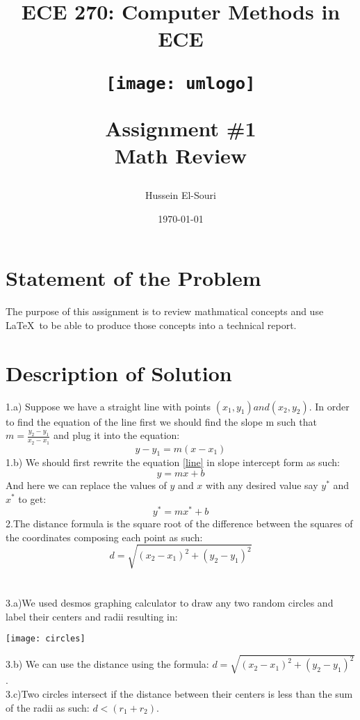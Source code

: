 \documentclass[letterpaper, 24pt, final, onecolumn, titlepage] {article}
\title{ECE 270: Computer Methods in ECE \\
	\vspace{1.5cm}
   		\begin{center}\texttt{[image: umlogo]} \end{center}
	\vspace{1.5cm}
	\textbf{Assignment \#1} \\
	Math Review}
\author{Hussein El-Souri}
\date{\today}
\begin{document}
\maketitle

\doublespacing

\section{Statement of the Problem}
The purpose of this assignment is to review mathmatical concepts and use \LaTeX\ to be able to produce those concepts into a technical report.\\

\pagebreak

\section{Description of Solution}
1.a) Suppose we have a straight line with points $(x_1, y_1) and (x_2, y_2)$.
In order to find the equation of the line first we should find the slope m such that $m=\frac{y_2-y_1}{x_2-x_1}$ and plug it into the equation:
\begin{equation} \label{line} 
	y - y_1 =  m(x - x_1)
\end{equation}
1.b) We should first rewrite the equation \ref{line} in slope intercept form as such:
\begin{equation} \label{line_intercept}
	y = mx + b
\end{equation}
And here we can replace the values of $y$ and $x$ with any desired value say $y^*$ and $x^*$ to get:
\begin{equation}\label{line_final}
y^* = mx^* + b
\end{equation}
2.The distance formula is the square root of the difference between the squares of the coordinates composing each point as such:
\begin{equation}\label{distance}
d = \sqrt{(x_2-x_1)^2 + (y_2-y_1)^2}
\end{equation}
\\\\3.a)We used desmos graphing calculator to draw any two random circles and label their centers and radii resulting in:
\begin{center}\texttt{[image: circles]} \end{center}
3.b) We can use the distance using the formula: $d = \sqrt{(x_2-x_1)^2 + (y_2-y_1)^2}$.\\
3.c)Two circles intersect if the distance between their centers is less than the sum of the radii as such: $d < (r_1 + r_2)$.\\\\
\end{document}
